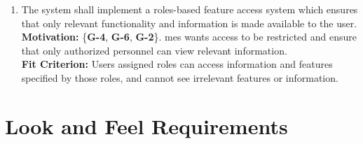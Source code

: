 \documentclass[12pt]{article}
\begin{document}
\begin{enumerate}[align=left,
  leftmargin=*,
  labelsep=1em,
  itemindent=0em,
  label=\bfseries FR-\arabic*:,
  ref=\bfseries FR-\arabic*]
    once an event has completed.\\[2mm]
  {\bf Motivation:} \{\textbf{G-5}, \textbf{G-4}, \textbf{G-3}\}. See \ref{FR9}.\\
  {\bf Fit Criterion:} See \ref{FR9}.
  \item \label{FR11} The system shall implement a roles-based feature access system which ensures that only relevant
    functionality and information is made available to the user.\\[2mm]
    {\bf Motivation:} \{{\bf G-4}, {\bf G-6}, {\bf G-2}\}. \Gls{mes} wants access to be restricted and ensure that
    only authorized personnel can view relevant information.\\
    {\bf Fit Criterion:} Users assigned roles can access information and features specified by those roles, and cannot
    see irrelevant features or information.
\end{enumerate}

\section{Look and Feel Requirements}
\end{document}
